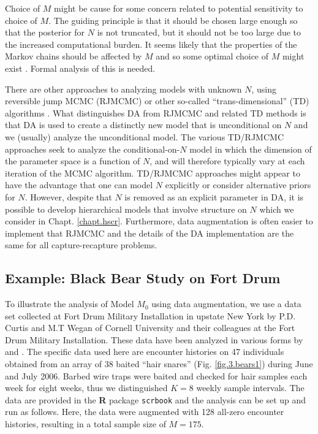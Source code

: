 Choice of $M$ might be cause for some concern related
to potential sensitivity to choice of $M$. The guiding principle is
that it should be chosen large enough so that the posterior for $N$ is
not truncated, but it should not be too large due to the increased %
computational burden. It seems likely that the properties of the
Markov chains should be affected by $M$ and so some optimal choice of
$M$ might exist \citep{gopalaswamy_etal:2012}.
Formal analysis of this is needed.


There are other approaches to analyzing models with unknown $N$, using
reversible jump MCMC (RJMCMC) or other so-called ``trans-dimensional''
(TD) algorithms \citep{king_brooks:2001, durban_elston:2005,
  king_etal:2008, schofield_barker:2008, wright_etal:2009}.  What
distinguishes DA from RJMCMC and related TD methods is that DA is used
to create a distinctly new model that is unconditional on $N$ and we
(usually) analyze the unconditional model. The various TD/RJMCMC
approaches seek to analyze the conditional-on-$N$ model in which the
dimension of the parameter space is a function of $N$, and will
therefore typically vary at each iteration of the MCMC
algorithm. TD/RJMCMC approaches might appear to have the advantage
that one can model $N$ explicitly or consider alternative priors for
$N$. However, despite that $N$ is removed as an explicit parameter in
DA, it is possible to develop hierarchical models that involve
structure on $N$ \citep{converse_royle:2010, royle_etal:2011ms} which
we consider in Chapt. \ref{chapt.hscr}. Furthermore, data augmentation
is often easier to implement that RJMCMC and the details of the
DA implementation are the same for all capture-recapture problems.


\subsection{Example: Black Bear Study on Fort Drum}

To illustrate the analysis of Model $M_0$ using data augmentation, we use
a data set collected at Fort Drum Military Installation in upstate New
York by P.D. Curtis and M.T Wegan of Cornell University and
their colleagues at the Fort Drum Military Installation.
These data have been analyzed in various forms by
\citet{wegan:2008,gardner_etal:2009} and \citet{gardner_etal:2010jwm}.
The specific data used here are encounter histories on 47 individuals
obtained from an array of 38 baited ``hair snares''
(Fig. \ref{fig.3.bears1}) during June and July 2006.  Barbed wire
traps were baited and checked for hair samples each week for eight
weeks, thus we distinguished $K=8$ weekly sample intervals. The data are provided
in the {\bf R} package \mbox{\tt scrbook}
and the analysis can be set up and run as
follows. Here, the data were augmented with 128
all-zero encounter histories, resulting in a total sample size of $M=175$.

